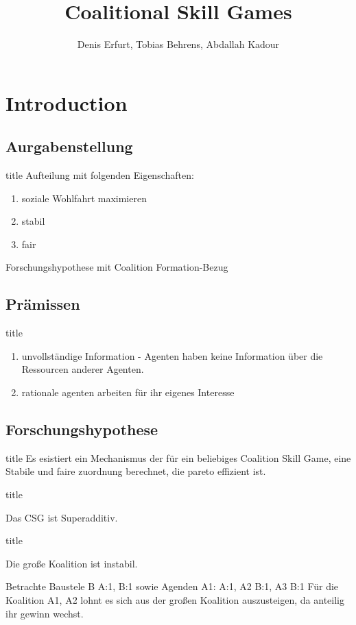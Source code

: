 \documentclass{beamer}
\title[] %
{Coalitional Skill Games}
\author[Denis Erfurt, Tobias Behrens, Abdallah Kadour] %
{Denis Erfurt, Tobias Behrens, Abdallah Kadour}
\theoremstyle{break}
\begin{document}
  \frame{\titlepage}

  \section*{Introduction}
  \subsection*{Aurgabenstellung}

  \begin{frame}[t]{title}
    Aufteilung mit folgenden Eigenschaften:
    \begin{enumerate}
      \item soziale Wohlfahrt maximieren
      \item stabil
      \item fair
    \end{enumerate}

    Forschungshypothese mit Coalition Formation-Bezug
  \end{frame}

  \subsection*{Prämissen}
  \begin{frame}[t]{title}
    \begin{enumerate}
      \item unvollständige Information - Agenten haben keine Information über die Ressourcen anderer Agenten.
      \item rationale agenten arbeiten für ihr eigenes Interesse
    \end{enumerate}
  \end{frame}

  \subsection*{Forschungshypothese}
  \begin{frame}[t]{title}
    Es esistiert ein Mechanismus der für ein beliebiges Coalition Skill Game, eine Stabile und faire zuordnung berechnet, die pareto effizient ist.
  \end{frame}

  \begin{frame}[t]{title}
    \begin{lemma}
      Das CSG ist Superadditiv.
    \end{lemma}
  \end{frame}

  \begin{frame}[t]{title}
    \begin{lemma}[Instabilität]
      Die große Koalition ist instabil.
    \end{lemma}
    Betrachte Baustele B {A:1, B:1} sowie Agenden A1: {A:1}, A2 {B:1}, A3 {B:1}
    Für die Koalition {A1, A2} lohnt es sich aus der großen Koalition auszusteigen, da anteilig ihr gewinn wechst.
  \end{frame}






\end{document}
